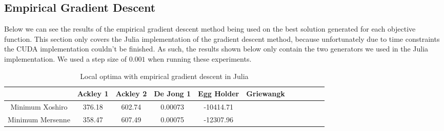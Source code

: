 \documentclass{article}
\begin{document}
        \subsection{Empirical Gradient Descent}
Below we can see the results of the empirical gradient descent method being used on the best solution generated for each objective function. This section only covers the Julia implementation of the gradient descent method, because unfortunately due to time constraints the CUDA implementation couldn’t be finished. As such, the results shown below only contain the two generators we used in the Julia implementation. We used a step size of $0.001$ when running these experiments. 
            \begin{table}[h!]
                \begin{centering}
                    \begin{tabular}{|c|c|c|c|c|c|c|c|c|c|c|}
                        \hline
                                        & Ackley 1 & Ackley 2 & De Jong 1 & Egg Holder & Griewangk \\
                        \hline
                        \hline
                        Minimum Xoshiro & 376.18  & 602.74   & 0.00073   & -10414.71  &           \\
                        \hline
                        Minimum Mersenne& 358.47  & 607.49   & 0.00075   & -12307.96  &           \\
                        \hline
                    \end{tabular}
                    \caption{Local optima with empirical gradient descent in Julia}
            \end{centering}
            \end{table}
\end{document}
